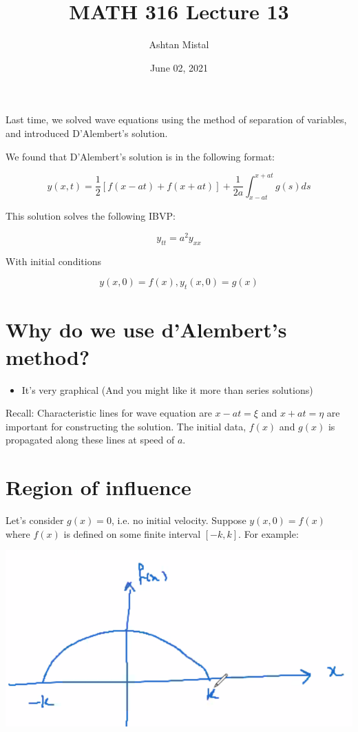 \documentclass{article}
\title{MATH 316 Lecture 13}
\author{Ashtan Mistal}
\date{June 02, 2021}
\begin{document}
\ifstandalone
\maketitle
\fi

\graphicspath{{./Lecture13/}}

Last time, we solved wave equations using the method of separation of variables, and introduced D'Alembert's solution. 

We found that D'Alembert's solution is in the following format:

$$y(x,t) = \frac{1}{2} \left[ f(x-at) + f(x+at) \right] + \frac{1}{2a} \int_{x-at}^{x+at} g(s) ds$$

This solution solves the following IBVP:

$$y_{tt} = a^2 y_{xx}$$

With initial conditions

$$y(x,0) = f(x), y_t(x,0) = g(x)$$

\section{Why do we use d'Alembert's method?}

\begin{itemize}
    \item It's very graphical (And you might like it more than series solutions)
\end{itemize}

Recall: Characteristic lines for wave equation are $x-at = \xi$ and $x+at = \eta$ are important for constructing the solution.  The initial data, $f(x)$ and $g(x)$ is propagated along these lines at speed of $a$. 

\section{Region of influence}

Let's consider $g(x) = 0$, i.e. no initial velocity. Suppose $y(x,0) = f(x)$ where $f(x)$ is defined on some finite interval $[-k, k]$. For example:

\includegraphics[width = 0.7 \textwidth]{image1.png}
\end{document}
